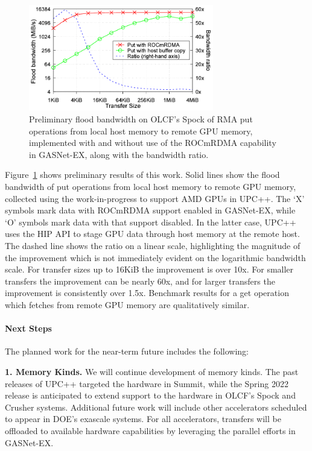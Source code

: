 \begin{figure}[htb]
  \centering
  \captionsetup{width=0.85\linewidth}
  \includegraphics[width=0.72\textwidth]{projects/2.3.1-PMR/2.3.1.14-UPCxx-GASNet/upcxx-spock.pdf}
  \caption{Preliminary flood bandwidth on OLCF's Spock of RMA put operations from
           local host memory to remote GPU memory, implemented with and without
           use of the ROCmRDMA capability in GASNet-EX, along with the bandwidth ratio.}
  \label{fig:upcxx-spock}
\end{figure}

Figure~\ref{fig:upcxx-spock} shows preliminary results of this work.  Solid
lines show the flood bandwidth of put operations from local host memory to
remote GPU memory, collected using the work-in-progress to support AMD GPUs in
UPC++.  The `X' symbols mark data with ROCmRDMA support enabled in GASNet-EX,
while `O' symbols mark data with that support disabled.  In the latter case,
UPC++ uses the HIP API to stage GPU data through host memory at the remote
host.  The dashed line shows the ratio on
a linear scale, highlighting the magnitude of the improvement which is not
immediately evident on the logarithmic bandwidth scale.  For transfer
sizes up to 16KiB the improvement is over 10x.  For smaller transfers the
improvement can be nearly 60x, and for larger transfers the improvement is consistently over
1.5x.  Benchmark results for a get operation which fetches from remote GPU
memory are qualitatively similar.

\paragraph{Next Steps}

The planned work for the near-term future includes the following:

\textbf{1. Memory Kinds.}
We will continue development of memory kinds.  The
past releases of UPC++ targeted the hardware in Summit, while the Spring 2022
release is anticipated to extend support to the hardware in OLCF's Spock
and Crusher systems.  Additional future work will
include other accelerators scheduled to appear in DOE's exascale systems.
For all accelerators, transfers will be offloaded to available hardware capabilities
by leveraging the parallel efforts in GASNet-EX.

